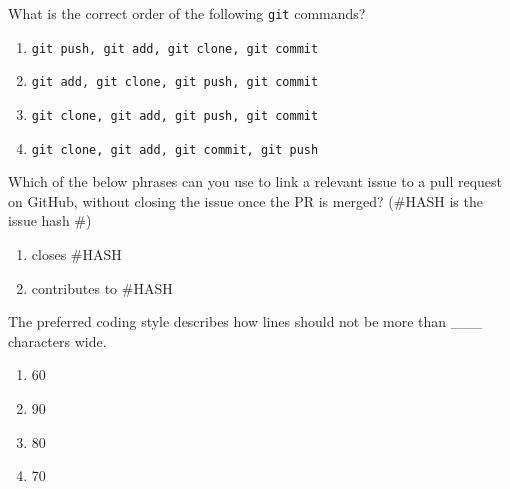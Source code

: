 \documentclass[12pt,fleqn]{examtst}
\begin{document}
\noindent
\begin{minipage}{\textwidth}

What is the correct order of the following \lstinline{git} commands?

\begin{enumerate}
    \item \lstinline{git push, git add, git clone, git commit}
    \item \lstinline{git add, git clone, git push, git commit}
    \item \lstinline{git clone, git add, git push, git commit}
    \item \lstinline{git clone, git add, git commit, git push}
\end{enumerate}
\rule{0cm}{1cm}

Which of the below phrases can you use to link a relevant issue to a pull request on GitHub, without closing the issue once the PR is merged? (\#HASH is the issue hash \#)

\begin{enumerate}
    \item closes \#HASH
    \item contributes to \#HASH
\end{enumerate}
\rule{0cm}{1cm}

The preferred coding style describes how lines should not be more than \_\_\_ characters wide.

\begin{enumerate}
    \item 60
    \item 90
    \item 80
    \item 70
\end{enumerate}
\rule{0cm}{1cm}

\end{minipage}

\end{document}
